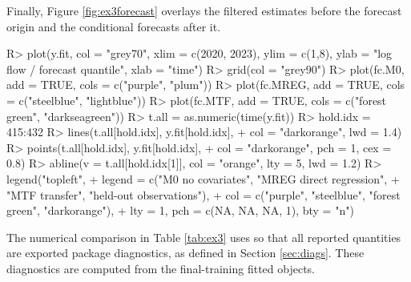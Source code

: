 \documentclass{jss}
\begin{document}
Finally, Figure \ref{fig:ex3forecast} overlays the filtered estimates before the forecast
origin and the conditional forecasts after it.

\begin{CodeChunk}
\begin{CodeInput}
R> plot(y.fit, col = "grey70", xlim = c(2020, 2023), ylim = c(1,8),
        ylab = "log flow / forecast quantile", xlab = "time")
R> grid(col = "grey90")
R> plot(fc.M0, add = TRUE, cols = c("purple", "plum"))
R> plot(fc.MREG, add = TRUE, cols = c("steelblue", "lightblue"))
R> plot(fc.MTF, add = TRUE, cols = c("forest green", "darkseagreen"))
R> t.all = as.numeric(time(y.fit))
R> hold.idx = 415:432
R> lines(t.all[hold.idx], y.fit[hold.idx],
+           col = "darkorange", lwd = 1.4)
R> points(t.all[hold.idx], y.fit[hold.idx],
+            col = "darkorange", pch = 1, cex = 0.8)
R> abline(v = t.all[hold.idx[1]], col = "orange", lty = 5, lwd = 1.2)
R> legend("topleft",
+            legend = c("M0 no covariates", "MREG direct regression",
+                       "MTF transfer", "held-out observations"),
+            col = c("purple", "steelblue", "forest green", "darkorange"),
+            lty = 1, pch = c(NA, NA, NA, 1), bty = "n")
\end{CodeInput}
\end{CodeChunk}

The numerical comparison in Table
\ref{tab:ex3} uses  so that all reported quantities
are exported package diagnostics, as defined in Section \ref{sec:diags}. These
diagnostics are computed from the final-training fitted objects.

\begin{CodeChunk}
\end{CodeChunk}
\end{document}
